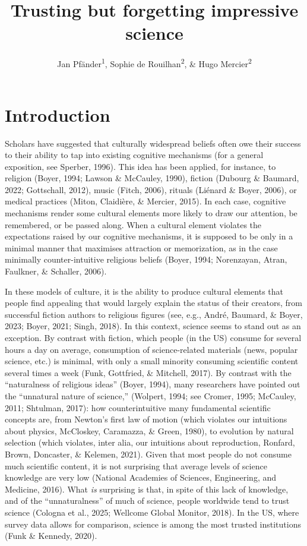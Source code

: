\documentclass[
  english,
  doc,floatsintext]{apa6}
\title{Trusting but forgetting impressive science}
\author{Jan Pfänder\textsuperscript{1}, Sophie de Rouilhan\textsuperscript{2}, \& Hugo Mercier\textsuperscript{2}}
\date{}
\affiliation{\vspace{0.5cm}\textsuperscript{1} Swiss Federal Institute of Aquatic Science and Technology (Eawag), Department of Environmental Social Sciences\\\textsuperscript{2} Institut Jean Nicod, Département d'études cognitives, ENS, EHESS, PSL University, CNRS, France}
\begin{document}
\maketitle

\section{Introduction}\label{introduction}

Scholars have suggested that culturally widespread beliefs often owe their success to their ability to tap into existing cognitive mechanisms (for a general exposition, see Sperber, 1996). This idea has been applied, for instance, to religion (Boyer, 1994; Lawson \& McCauley, 1990), fiction (Dubourg \& Baumard, 2022; Gottschall, 2012), music (Fitch, 2006), rituals (Liénard \& Boyer, 2006), or medical practices (Miton, Claidière, \& Mercier, 2015). In each case, cognitive mechanisms render some cultural elements more likely to draw our attention, be remembered, or be passed along. When a cultural element violates the expectations raised by our cognitive mechanisms, it is supposed to be only in a minimal manner that maximises attraction or memorization, as in the case minimally counter-intuitive religious beliefs (Boyer, 1994; Norenzayan, Atran, Faulkner, \& Schaller, 2006).

In these models of culture, it is the ability to produce cultural elements that people find appealing that would largely explain the status of their creators, from successful fiction authors to religious figures (see, e.g., André, Baumard, \& Boyer, 2023; Boyer, 2021; Singh, 2018). In this context, science seems to stand out as an exception. By contrast with fiction, which people (in the US) consume for several hours a day on average, consumption of science-related materials (news, popular science, etc.) is minimal, with only a small minority consuming scientific content several times a week (Funk, Gottfried, \& Mitchell, 2017). By contrast with the ``naturalness of religious ideas'' (Boyer, 1994), many researchers have pointed out the ``unnatural nature of science,'' (Wolpert, 1994; see Cromer, 1995; McCauley, 2011; Shtulman, 2017): how counterintuitive many fundamental scientific concepts are, from Newton's first law of motion (which violates our intuitions about physics, McCloskey, Caramazza, \& Green, 1980), to evolution by natural selection (which violates, inter alia, our intuitions about reproduction, Ronfard, Brown, Doncaster, \& Kelemen, 2021). Given that most people do not consume much scientific content, it is not surprising that average levels of science knowledge are very low (National Academies of Sciences, Engineering, and Medicine, 2016). What \emph{is} surprising is that, in spite of this lack of knowledge, and of the ``unnaturalness'' of much of science, people worldwide tend to trust science (Cologna et al., 2025; Wellcome Global Monitor, 2018). In the US, where survey data allows for comparison, science is among the most trusted institutions (Funk \& Kennedy, 2020).
\end{document}
